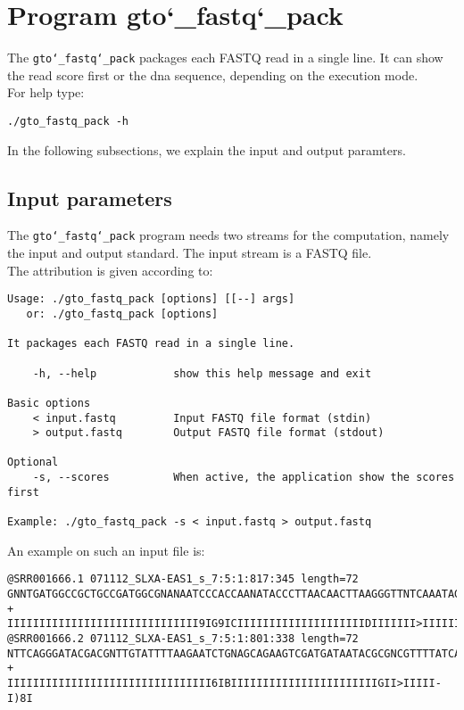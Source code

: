 \section{Program gto\char`_fastq\char`_pack}
The \texttt{gto\char`_fastq\char`_pack} packages each FASTQ read in a single line. It can show the read score first or the dna sequence, depending on the execution mode. \\
For help type:
\begin{lstlisting}
./gto_fastq_pack -h
\end{lstlisting}
In the following subsections, we explain the input and output paramters.

\subsection*{Input parameters}

The \texttt{gto\char`_fastq\char`_pack} program needs two streams for the computation,
namely the input and output standard. The input stream is a FASTQ file.\\
The attribution is given according to:
\begin{lstlisting}
Usage: ./gto_fastq_pack [options] [[--] args]
   or: ./gto_fastq_pack [options]

It packages each FASTQ read in a single line.

    -h, --help            show this help message and exit

Basic options
    < input.fastq         Input FASTQ file format (stdin)
    > output.fastq        Output FASTQ file format (stdout)

Optional
    -s, --scores          When active, the application show the scores first

Example: ./gto_fastq_pack -s < input.fastq > output.fastq
\end{lstlisting}
An example on such an input file is:
\begin{lstlisting}
@SRR001666.1 071112_SLXA-EAS1_s_7:5:1:817:345 length=72
GNNTGATGGCCGCTGCCGATGGCGNANAATCCCACCAANATACCCTTAACAACTTAAGGGTTNTCAAATAGA
+
IIIIIIIIIIIIIIIIIIIIIIIIIIIIII9IG9ICIIIIIIIIIIIIIIIIIIIIDIIIIIII>IIIIII/
@SRR001666.2 071112_SLXA-EAS1_s_7:5:1:801:338 length=72
NTTCAGGGATACGACGNTTGTATTTTAAGAATCTGNAGCAGAAGTCGATGATAATACGCGNCGTTTTATCAN
+
IIIIIIIIIIIIIIIIIIIIIIIIIIIIIIII6IBIIIIIIIIIIIIIIIIIIIIIIIGII>IIIII-I)8I
\end{lstlisting}

